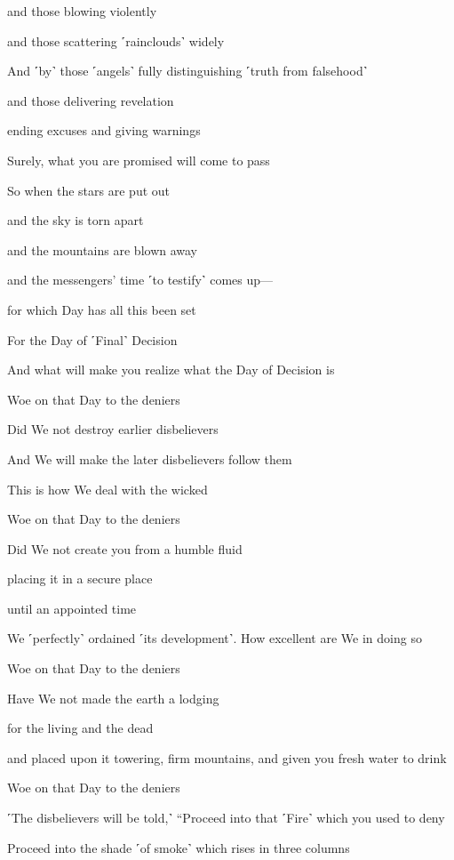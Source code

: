 and those blowing violently

and those scattering ˹rainclouds˺ widely

And ˹by˺ those ˹angels˺ fully distinguishing ˹truth from falsehood˺

and those delivering revelation

ending excuses and giving warnings

Surely, what you are promised will come to pass

So when the stars are put out

and the sky is torn apart

and the mountains are blown away

and the messengers’ time ˹to testify˺ comes up—

for which Day has all this been set

For the Day of ˹Final˺ Decision

And what will make you realize what the Day of Decision is

Woe on that Day to the deniers

Did We not destroy earlier disbelievers

And We will make the later disbelievers follow them

This is how We deal with the wicked

Woe on that Day to the deniers

Did We not create you from a humble fluid

placing it in a secure place

until an appointed time

We ˹perfectly˺ ordained ˹its development˺. How excellent are We in doing so

Woe on that Day to the deniers

Have We not made the earth a lodging

for the living and the dead

and placed upon it towering, firm mountains, and given you fresh water to drink

Woe on that Day to the deniers

˹The disbelievers will be told,˺ “Proceed into that ˹Fire˺ which you used to deny

Proceed into the shade ˹of smoke˺ which rises in three columns


